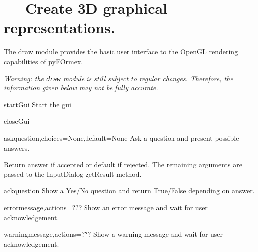 
\section{ --- Create 3D graphical representations.}
\label{sec:draw}


The draw module provides the basic user interface to the OpenGL
rendering capabilities of pyFOrmex.

\emph{Warning: the \texttt{draw} module is still subject to regular changes.
Therefore, the information given below may not be fully accurate.
}



\begin{funcdesc}{startGui}{}
Start the gui

\end{funcdesc}


\begin{funcdesc}{closeGui}{}


\end{funcdesc}


\begin{funcdesc}{ask}{question,choices=None,default=None}
Ask a question and present possible answers.

    Return answer if accepted or default if rejected.
    The remaining arguments are passed to the InputDialog getResult method.
    

\end{funcdesc}


\begin{funcdesc}{ack}{question}
Show a Yes/No question and return True/False depending on answer.

\end{funcdesc}


\begin{funcdesc}{error}{message,actions=???}
Show an error message and wait for user acknowledgement.

\end{funcdesc}


\begin{funcdesc}{warning}{message,actions=???}
Show a warning message and wait for user acknowledgement.

\end{funcdesc}


